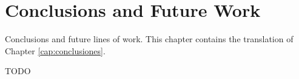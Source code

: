 \chapter*{Conclusions and Future Work}
\label{cap:conclusions}

Conclusions and future lines of work. This chapter contains the translation of Chapter \ref{cap:conclusiones}.

TODO
